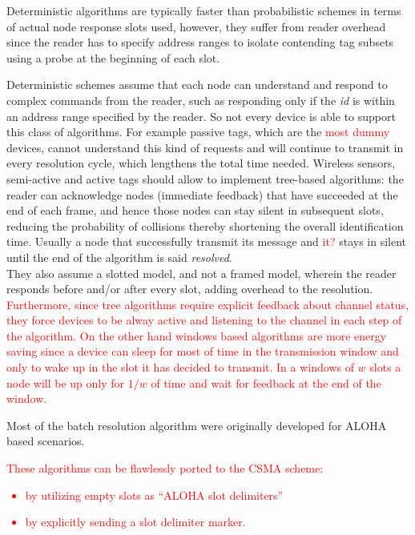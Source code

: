 \documentclass[12pt,a4paper]{report}
\begin{document}
Deterministic algorithms are typically faster than probabilistic schemes in terms of actual node response slots used, however, they suffer from reader overhead since the reader has to specify address ranges to isolate contending tag subsets using a probe at the beginning of each slot.

Deterministic schemes assume that each node can understand and respond to complex commands from the reader, such as responding only if the \emph{id} is within an address range specified by the reader. So not every device is able to support this class of algorithms. For example passive tags, which are the \textcolor{red}{most dummy} devices, cannot understand this kind of requests and will continue to transmit in every resolution cycle, which lengthens the total time needed. Wireless sensors, semi-active and active tags should allow to implement tree-based algorithms: the reader can acknowledge nodes (immediate feedback) that have succeeded at the end of each frame, and hence those nodes can stay silent in subsequent slots, reducing the probability of collisions thereby shortening the overall identification time. Usually a node that successfully transmit its message and \textcolor{red}{it?} stays in silent until the end of the algorithm is said \emph{resolved}.\\
They also assume a slotted model, and not a framed model, wherein the reader responds before and/or after every slot, adding overhead to the resolution.\\
\textcolor{red}{
Furthermore, since tree algorithms require explicit feedback about channel status, they force devices to be alway active and listening to the channel in each step of the algorithm.
On the other hand windows based algorithms are more energy saving since a device can sleep for most of time in the transmission window and only to wake up in the slot it has decided to transmit. In a windows of $w$ slots  a node will be up only for $1/w$ of time and wait for feedback at the end of the window.}


Most of the batch resolution algorithm were originally developed for ALOHA based scenarios.\\
\textcolor{red}{
These algorithms can be flawlessly ported to the CSMA scheme:
\begin{itemize}
\item by utilizing empty slots as ``ALOHA slot delimiters''
\item by explicitly sending a slot delimiter marker.
\end{itemize}
} 
 
\end{document}
